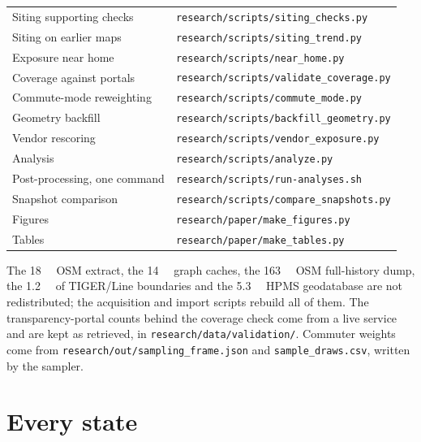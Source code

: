 \documentclass[11pt,twoside]{article}
\newcommand{\alpr}{ALPR\xspace}
\begin{document}
\begin{table}[htbp]
\begin{tabular}{ll}
Siting supporting checks    & \texttt{research/scripts/siting\_checks.py} \\
Siting on earlier maps      & \texttt{research/scripts/siting\_trend.py} \\
Exposure near home          & \texttt{research/scripts/near\_home.py} \\
Coverage against portals    & \texttt{research/scripts/validate\_coverage.py} \\
Commute-mode reweighting    & \texttt{research/scripts/commute\_mode.py} \\
Geometry backfill           & \texttt{research/scripts/backfill\_geometry.py} \\
Vendor rescoring            & \texttt{research/scripts/vendor\_exposure.py} \\
Analysis                    & \texttt{research/scripts/analyze.py} \\
Post-processing, one command & \texttt{research/scripts/run-analyses.sh} \\
Snapshot comparison         & \texttt{research/scripts/compare\_snapshots.py} \\
Figures                     & \texttt{research/paper/make\_figures.py} \\
Tables                      & \texttt{research/paper/make\_tables.py} \\
\bottomrule
\end{tabular}
\end{table}

\noindent
The \SI{18}{\giga\byte} OSM extract, the \SI{14}{\giga\byte} graph caches, the
\SI{163}{\giga\byte} OSM full-history dump, the \SI{1.2}{\giga\byte} of TIGER/Line boundaries and
the \SI{5.3}{\giga\byte} HPMS geodatabase are not redistributed; the acquisition and import scripts rebuild all of them. The
transparency-portal counts behind the coverage check come from a live service and are kept as
retrieved, in \texttt{research/data/validation/}. Commuter weights come from
\texttt{research/out/sampling\_frame.json} and \texttt{sample\_draws.csv}, written by the
sampler.




\appendix
\section{Every state}
\label{app:states}

\begin{table}[p]
\centering
\footnotesize
\setlength{\tabcolsep}{4pt}
\caption{Every state and the District of Columbia. Commuters are in-state commuters in the
LODES frame; ``routed'' excludes the unroutable commutes of . Mapped
\alpr are nodes inside the state on 2026-09-22, per \num{100000} residents from ACS 2022.
Exposure and avoidance figures are within-state estimates; the national row is
commuter-weighted as in .}
\label{tab:bystate}

\end{table}
\end{document}
